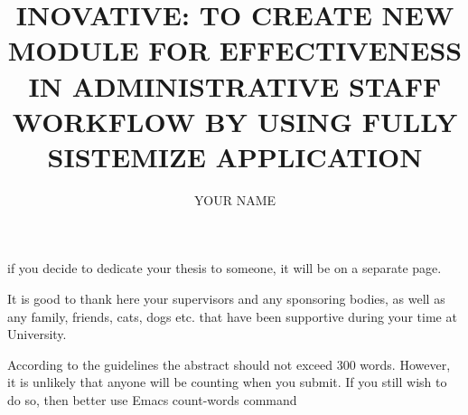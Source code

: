
\raggedbottom 

\title{INOVATIVE: TO CREATE NEW MODULE FOR EFFECTIVENESS IN ADMINISTRATIVE STAFF WORKFLOW BY USING FULLY SISTEMIZE APPLICATION}
\author{YOUR NAME}




\copyrightyear{\number\the\year} %


\beforepreface %


\clearpage
{}
\begin{center}
if you decide to dedicate your thesis to someone, it will be on a separate page.
\end{center}

\renewcommand\listtablename{\normalsize\normalfont\centering\vspace*{-0.5in} ACKNOWLEDGEMENTS}
\begin{singlespace} 


It is good to thank here your supervisors and any sponsoring bodies, as well as any family,
friends, cats, dogs etc. that have been supportive during your time at University.
\end{singlespace}
\iftablespage
{}
{}%

\renewcommand\listtablename{\normalsize\normalfont\centering\vspace*{-0.5in} ABSTRACT}
\iftablespage
{}
{}

According to the guidelines the abstract should not exceed 300 words. However, it is unlikely that anyone will be counting when you submit. If you still wish to do so, then better use
Emacs count-words command



